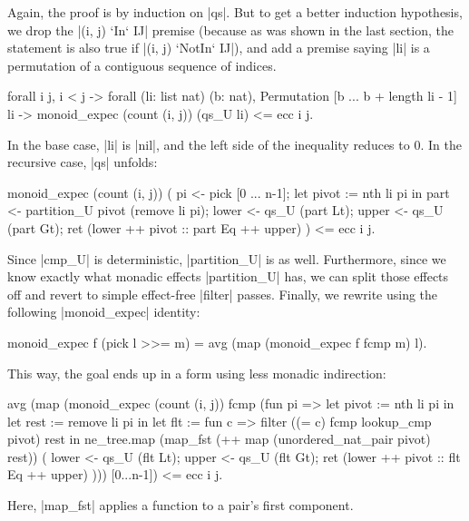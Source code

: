 \documentclass[runningheads]{llncs}
\begin{document}
Again, the proof is by induction on |qs|. But to get a better induction hypothesis, we drop the |(i, j) `In` IJ| premise (because as was shown in the last section, the statement is also true if |(i, j) `NotIn` IJ|), and add a premise saying |li| is a permutation of a contiguous sequence of indices.
\begin{code}
  forall i j, i < j -> forall (li: list nat) (b: nat), Permutation [b ... b + length li - 1] li ->
    monoid_expec (count (i, j)) (qs_U li) <= ecc i j.
\end{code}
In the base case, |li| is |nil|, and the left side of the inequality reduces to 0. In the recursive case, |qs| unfolds:
\begin{code}
monoid_expec (count (i, j)) (
    pi <- pick [0 ... n-1];
    let pivot := nth li pi in
    part <- partition_U pivot (remove li pi);
    lower <- qs_U (part Lt);
    upper <- qs_U (part Gt);
    ret (lower ++ pivot :: part Eq ++ upper)
  ) <= ecc i j.
\end{code}
Since |cmp_U| is deterministic, |partition_U| is as well. Furthermore, since
we know exactly what monadic effects |partition_U| has, we can split those
effects off and revert to simple effect-free |filter| passes. Finally, we rewrite using the following |monoid_expec| identity:
\begin{code}
  monoid_expec f (pick l >>= m) = avg (map (monoid_expec f fcmp m) l).
\end{code}
This way, the goal ends up in a form using less monadic indirection:
\begin{code}
avg (map (monoid_expec (count (i, j)) fcmp (fun pi =>
    let pivot := nth li pi in
    let rest := remove li pi in
    let flt := fun c => filter ((= c) fcmp lookup_cmp pivot) rest in
    ne_tree.map (map_fst (++ map (unordered_nat_pair pivot) rest)) (
      lower <- qs_U (flt Lt);
      upper <- qs_U (flt Gt);
      ret (lower ++ pivot :: flt Eq ++ upper)
    ))) [0...n-1]) <= ecc i j.
\end{code}
Here, |map_fst| applies a function to a pair's first component.
\end{document}
